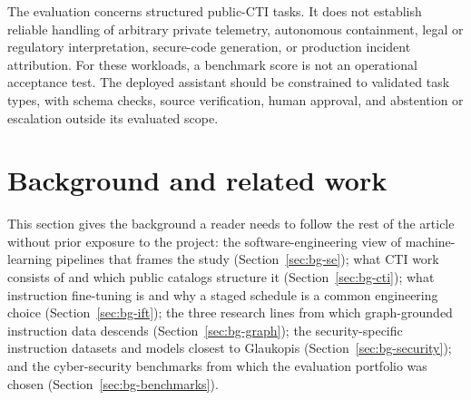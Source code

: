 \documentclass[twocolumn]{svjour3}
\begin{document}
The evaluation concerns structured public-CTI tasks. It does not establish reliable handling of arbitrary private telemetry, autonomous containment, legal or regulatory interpretation, secure-code generation, or production incident attribution. For these workloads, a benchmark score is not an operational acceptance test. The deployed assistant should be constrained to validated task types, with schema checks, source verification, human approval, and abstention or escalation outside its evaluated scope.

\section{Background and related work}\label{sec:related}
This section gives the background a reader needs to follow the rest of the article without prior exposure to the project: the software-engineering view of machine-learning pipelines that frames the study (Section~\ref{sec:bg-se}); what CTI work consists of and which public catalogs structure it (Section~\ref{sec:bg-cti}); what instruction fine-tuning is and why a staged schedule is a common engineering choice (Section~\ref{sec:bg-ift}); the three research lines from which graph-grounded instruction data descends (Section~\ref{sec:bg-graph}); the security-specific instruction datasets and models closest to Glaukopis (Section~\ref{sec:bg-security}); and the cyber-security benchmarks from which the evaluation portfolio was chosen (Section~\ref{sec:bg-benchmarks}).
\end{document}
